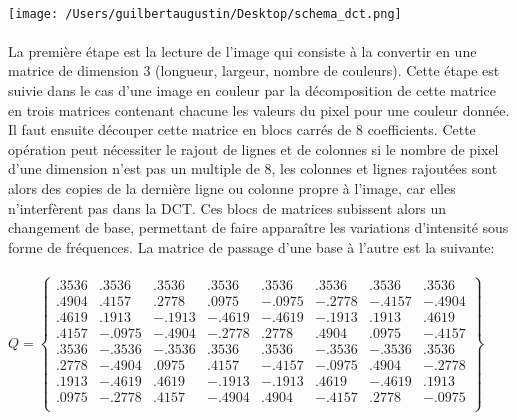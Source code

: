 \documentclass[12pt]{article}
\begin{document}
\paragraph{}
\texttt{[image: /Users/guilbertaugustin/Desktop/schema\_dct.png]} %
\paragraph{}
La première étape est la lecture de l’image qui consiste à la convertir en une matrice de dimension 3 (longueur, largeur, nombre de couleurs). Cette étape est suivie dans le cas d’une image en couleur par la décomposition de cette matrice en trois matrices contenant chacune les valeurs du pixel pour une couleur donnée. Il faut ensuite découper cette matrice en blocs carrés de 8 coefficients. Cette opération peut nécessiter le rajout de lignes et de colonnes si le nombre de pixel d’une dimension n’est pas un multiple de 8, les colonnes et lignes rajoutées sont alors des copies de la dernière ligne ou colonne propre à l’image, car elles n’interfèrent pas dans la DCT. Ces blocs de matrices subissent alors un changement de base, permettant de faire apparaître les variations d’intensité sous forme de fréquences. La matrice de passage d’une base à l’autre est la suivante:
\paragraph{}
\begin{center}
$Q=
\begin{Bmatrix}

.3536& .3536& .3536& .3536& .3536& .3536& .3536& .3536 \\
.4904& .4157& .2778& .0975& -.0975& -.2778& -.4157& -.4904 \\
.4619& .1913& -.1913& -.4619& -.4619& -.1913& .1913& .4619 \\
.4157& -.0975& -.4904& -.2778 & .2778& .4904& .0975& -.4157 \\
.3536& -.3536& -.3536& .3536& .3536& -.3536& -.3536& .3536 \\
.2778& -.4904& .0975& .4157& -.4157& -.0975& .4904& -.2778 \\
.1913& -.4619& .4619& -.1913& -.1913& .4619& -.4619& .1913 \\
.0975& -.2778& .4157& -.4904& .4904& -.4157& .2778& -.0975 \\

\end{Bmatrix}
$
\end{center}
\end{document}
